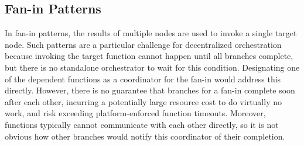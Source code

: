 

\subsection{Fan-in Patterns}\label{sec:design:fanin}

In fan-in patterns, the results of multiple nodes are used to invoke a single
target node. Such patterns are a particular challenge for decentralized
orchestration because invoking the target function cannot happen until all
branches complete, but there is no standalone orchestrator to wait for this
condition. Designating one of the dependent functions as a coordinator for
the fan-in would address this directly. However, there is no guarantee that
branches for a fan-in complete soon after each other, incurring a potentially
large resource cost to do virtually no work, and risk exceeding
platform-enforced function timeouts. Moreover, functions typically cannot
communicate with each other directly, so it is not obvious how other branches
would notify this coordinator of their completion.

